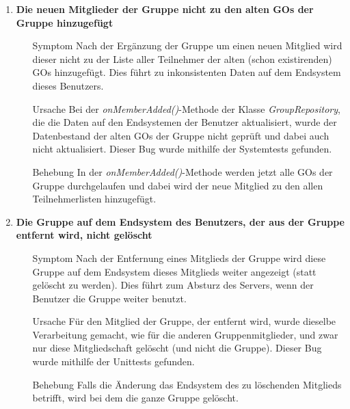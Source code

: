 \documentclass[11pt,a4paper]{scrartcl}
\def\threedigits#1{%
  \ifnum#1<100 0\fi
  \ifnum#1<10 0\fi
  \number#1}
\begin{document}
\begin{enumerate}[label={\textbf{/B\protect\threedigits{\theenumi}0/}}, leftmargin=*]
\item \textbf{Die neuen Mitglieder der Gruppe nicht zu den alten GOs der Gruppe hinzugefügt}
	\begin{itemize}
		\item[Symptom] Nach der Ergänzung der Gruppe um einen neuen Mitglied wird dieser nicht zu der Liste aller Teilnehmer der alten (schon existirenden) GOs hinzugefügt. Dies führt zu inkonsistenten Daten auf dem Endsystem dieses Benutzers.
		\item[Ursache] Bei der \textit{onMemberAdded()}-Methode der Klasse \textit{GroupRepository}, die die Daten auf den Endsystemen der Benutzer aktualisiert, wurde der Datenbestand der alten GOs der Gruppe nicht geprüft und dabei auch nicht aktualisiert. Dieser Bug wurde mithilfe der Systemtests gefunden.
		\item[Behebung] In der \textit{onMemberAdded()}-Methode werden jetzt alle GOs der Gruppe durchgelaufen und dabei wird der neue Mitglied zu den allen Teilnehmerlisten hinzugefügt.
	\end{itemize}
	
\item \textbf{Die Gruppe auf dem Endsystem des Benutzers, der aus der Gruppe entfernt wird, nicht gelöscht}
	\begin{itemize}
		\item[Symptom] Nach der Entfernung eines Mitglieds der Gruppe wird diese Gruppe auf dem Endsystem dieses Mitglieds weiter angezeigt (statt gelöscht zu werden). Dies führt zum Absturz des Servers, wenn der Benutzer die Gruppe weiter benutzt.
		\item[Ursache] Für den Mitglied der Gruppe, der entfernt wird, wurde dieselbe Verarbeitung gemacht, wie für die anderen Gruppenmitglieder, und zwar nur diese Mitgliedschaft gelöscht (und nicht die Gruppe). Dieser Bug wurde mithilfe der Unittests gefunden.
		\item[Behebung] Falls die Änderung das Endsystem des zu löschenden Mitglieds betrifft, wird bei dem die ganze Gruppe gelöscht.
	\end{itemize}
	

\end{enumerate}
\end{document}
